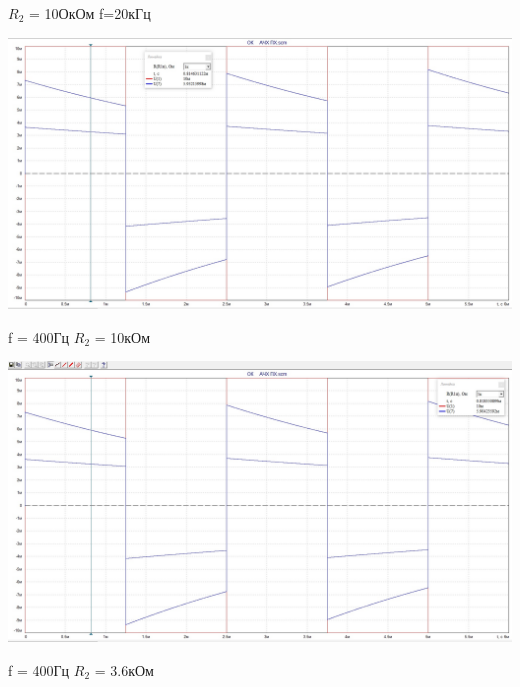 \documentclass[a4paper,14pt]{extarticle}
\begin{document}
    $R_2$ = 10ОкОм f=20кГц

    \begin{center}
        \includegraphics[scale=0.3]{5.3.jpg}
    \end{center}
    
    f = 400Гц $R_2$ = 10кОм 

    \begin{center}
        \includegraphics[scale=0.3]{5.4.jpg}
    \end{center}

    f = 400Гц $R_2$ = 3.6кОм 
\end{document}
